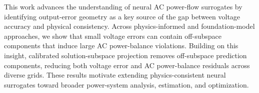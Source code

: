 \documentclass{article}
\begin{document}
This work advances the understanding of neural AC power-flow surrogates by
identifying output-error geometry as a key source of the gap between
voltage accuracy and physical consistency. Across physics-informed and
foundation-model approaches, we show that small voltage errors can contain
off-subspace components that induce large AC power-balance violations. Building on this insight,
calibrated solution-subspace projection removes
off-subspace prediction components, reducing both voltage error and AC
power-balance residuals across diverse grids.
These results motivate extending physics-consistent neural surrogates toward
broader power-system analysis, estimation, and optimization.





\end{document}
